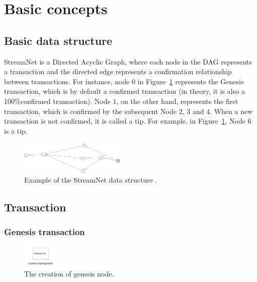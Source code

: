 \section{Basic concepts}
\subsection{Basic data structure}
StreamNet is a Directed Acyclic Graph, where each node in the DAG represents a transaction and the directed edge represents a confirmation relationship between transactions.
For instance, node $0$ in Figure~\ref{simple_sn} represents the Genesis transaction, which is by default a confirmed transaction (in theory, it is also a 100\%confirmed transaction).
Node $1$, on the other hand, represents the first transaction, which is confirmed by the subsequent Node $2$, $3$ and $4$. 
When a new transaction is not confirmed, it is called a tip.
For example, in Figure~\ref{simple_sn}, Node $6$ is a tip.

\begin{figure}[!ht]
\begin{center}
\includegraphics[width=0.45\textwidth]{figures/simple_sn.png}
    \caption{
        Example of the StreamNet data structure \cite{gal_2018}.
     }
\label{simple_sn}
\end{center}
\end{figure}



\subsection{Transaction}
\subsubsection{Genesis transaction}

\begin{figure}[!ht]
\begin{center}
\includegraphics[width=0.15\textwidth]{figures/genesis.png}
    \caption{
        The creation of genesis node.
     }
\label{genesis}
\end{center}
\end{figure}

